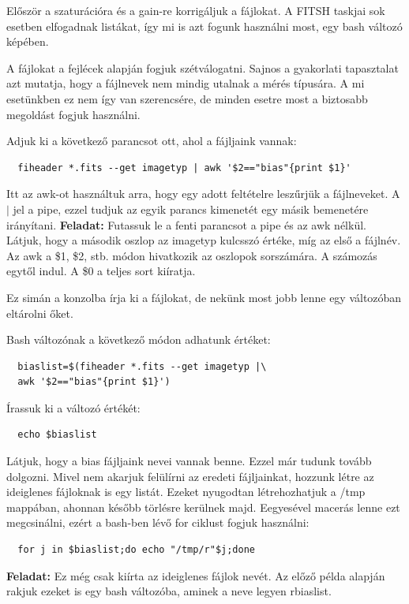 \documentclass{article}
\begin{document}
Először a szaturációra és a gain-re korrigáljuk a fájlokat. A FITSH taskjai sok
esetben elfogadnak listákat, így mi is azt fogunk használni most, egy bash
változó képében.

A fájlokat a fejlécek alapján fogjuk szétválogatni. Sajnos a gyakorlati
tapasztalat azt mutatja, hogy a fájlnevek nem mindig utalnak a mérés típusára.
A mi esetünkben ez nem így van szerencsére, de minden esetre most a biztosabb
megoldást fogjuk használni.

Adjuk ki a következő parancsot ott, ahol a fájljaink vannak:
\begin{verbatim}
  fiheader *.fits --get imagetyp | awk '$2=="bias"{print $1}'
\end{verbatim}

Itt az awk-ot használtuk arra, hogy egy adott feltételre leszűrjük a
fájlneveket. A $|$ jel a pipe, ezzel tudjuk az egyik parancs kimenetét egy
másik bemenetére irányítani.
{\bf Feladat:}
Futassuk le a fenti parancsot a pipe és az awk nélkül. Látjuk, hogy a második
oszlop az imagetyp kulcsszó értéke, míg az első a fájlnév. Az awk a \$1, \$2,
stb. módon hivatkozik az oszlopok sorszámára. A számozás egytől indul. A \$0 a
teljes sort kiíratja.

Ez simán a konzolba írja ki a fájlokat, de nekünk most jobb lenne egy
változóban eltárolni őket.

Bash változónak a következő módon adhatunk értéket:
\begin{verbatim}
  biaslist=$(fiheader *.fits --get imagetyp |\
  awk '$2=="bias"{print $1}')
\end{verbatim}

Írassuk ki a változó értékét:
\begin{verbatim}
  echo $biaslist
\end{verbatim}

Látjuk, hogy a bias fájljaink nevei vannak benne. Ezzel már tudunk tovább
dolgozni.
Mivel nem akarjuk felülírni az eredeti fájljainkat, hozzunk létre az ideiglenes
fájloknak is egy listát. Ezeket nyugodtan létrehozhatjuk a /tmp mappában,
ahonnan később törlésre kerülnek majd.
Eegyesével macerás lenne ezt megcsinálni, ezért a bash-ben lévő for ciklust
fogjuk használni:

\begin{verbatim}
  for j in $biaslist;do echo "/tmp/r"$j;done
\end{verbatim}

{\bf Feladat:}
Ez még csak kiírta az ideiglenes fájlok nevét. Az előző példa alapján rakjuk
ezeket is egy bash változóba, aminek a neve legyen rbiaslist.
\end{document}
